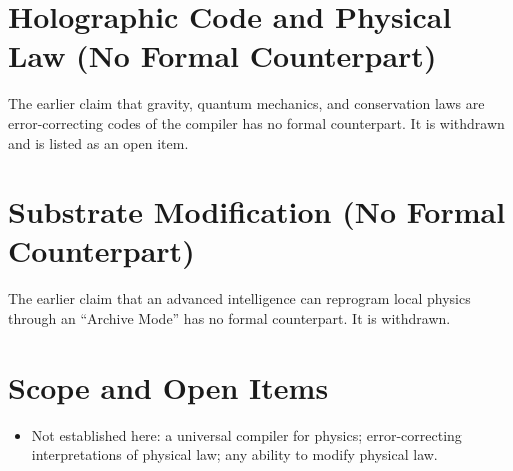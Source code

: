 \documentclass[11pt, a4paper]{article}
\begin{document}
\section{Holographic Code and Physical Law (No Formal Counterpart)}
The earlier claim that gravity, quantum mechanics, and conservation laws are error-correcting codes of the compiler has no formal counterpart. It is withdrawn and is listed as an open item.

\section{Substrate Modification (No Formal Counterpart)}
The earlier claim that an advanced intelligence can reprogram local physics through an ``Archive Mode'' has no formal counterpart. It is withdrawn.

\section{Scope and Open Items}
\begin{itemize}
  \item Not established here: a universal compiler for physics; error-correcting interpretations of physical law; any ability to modify physical law.
\end{itemize}
\end{document}
